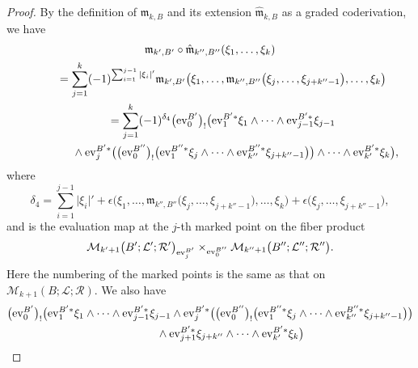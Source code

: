 \documentclass[pdftex]{sigma}
\numberwithin{equation}{section}
\theoremstyle{definition}
\begin{document}
\begin{proof}
By the definition of ${\mathfrak m}_{k,B}$ and its extension $\widehat{\mathfrak m}_{k,B}$ as a graded coderivation, we have
\begin{gather}
{\mathfrak m}_{k', B'} \circ \hat{\mathfrak m}_{k'',B''} (\xi_1, \dots, \xi_k) \nonumber\\
 \qquad{} =
\sum_{j=1}^k (-1)^{\sum_{i=1}^{j-1} \vert \xi_i \vert'} {\mathfrak m}_{k',B'} \bigl(\xi_1, \dots, {\mathfrak m}_{k'',B''}\bigl(\xi_j, \dots, \xi_{j+k''-1}\bigr), \dots, \xi_k\bigr)\nonumber\\
 \qquad{}= \sum_{j=1}^k (-1)^{\delta_4} \bigl({\rm ev}_0^{B'}\bigr)_! \bigl( {\rm ev}_1^{B'*}\xi_1 \wedge \dots \wedge {\rm ev}_{j-1}^{B'*} \xi_{j-1}\nonumber\\
 \qquad\hphantom{= \sum_{j=1}^k}{}
  \wedge {\rm ev}_j^{B'*} \bigl( \bigl({\rm ev}_0^{B''}\bigr)_! \bigl({\rm ev}_1^{B''*} \xi_j \wedge \dots \wedge {\rm ev}_{k''}^{B''*} \xi_{j+k''-1} \bigr)\bigr) \wedge \dots \wedge {\rm ev}_{k'}^{B'*} \xi_k \bigr),\label{equality1}
\end{gather}
where
\begin{equation*}
\delta_4 = \sum_{i=1}^{j-1} \vert \xi_i \vert' + \epsilon\bigl(\xi_1, \dots, {\mathfrak m}_{k'',B''}\bigl(\xi_j, \dots, \xi_{j+k''-1}\bigr), \dots, \xi_k\bigr) + \epsilon\bigl(\xi_j, \dots, \xi_{j+k''-1}\bigr),
\end{equation*}
and
 is
the evaluation map at the $j$-th marked point on the fiber product
\begin{equation*}
{\mathcal M}_{k'+1}\bigl(B';{\mathcal L}';{\mathcal R}'\bigr)_{{\rm ev}_j^{B'}} \times_{{\rm ev}_0^{B''}} {\mathcal M}_{k''+1}\bigl(B'';{\mathcal L}'';{\mathcal R}''\bigr).
\end{equation*}
Here the numbering of the marked points is the same as that on ${\mathcal M}_{k+1}(B;{\mathcal L};{\mathcal R})$.
We also have
\begin{gather*}
  \bigl({\rm ev}_0^{B'}\bigr)_! \bigl( {\rm ev}_1^{B'*}\xi_1 \wedge \dots \wedge {\rm ev}_{j-1}^{B'*} \xi_{j-1}
 \wedge {\rm ev}_j^{B'*} \bigl( \bigl({\rm ev}_0^{B''}\bigr)_! \bigl({\rm ev}_1^{B''*} \xi_j \wedge \dots \wedge {\rm ev}_{k''}^{B''*} \xi_{j+k''-1} \bigr)\bigr)  \\ \hphantom{\bigl({\rm ev}_0^{B'}\bigr)_! \bigl(}{}
   \wedge {\rm ev}_{j+1}^{B'*} \xi_{j+k''} \wedge \dots \wedge {\rm ev}_{k'}^{B'*} \xi_k \bigr)  \\

\end{gather*}
\end{proof}
\end{document}
